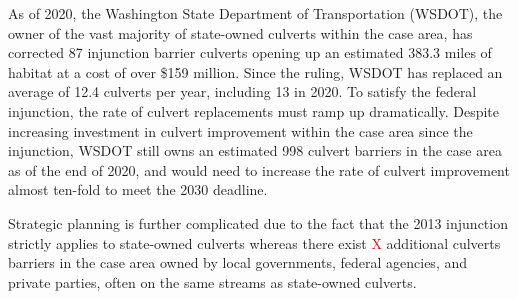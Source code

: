 \documentclass[12pt]{elsarticle}
\begin{document}
As of 2020, the Washington State Department of Transportation (WSDOT), the owner of the vast majority of state-owned culverts within the case area, has corrected 87 injunction barrier culverts opening up an estimated 383.3 miles of habitat at a cost of over \$159 million. Since the ruling, WSDOT has replaced an average of 12.4 culverts per year, including 13 in 2020. To satisfy the federal injunction, the rate of culvert replacements must ramp up dramatically. Despite increasing investment in culvert improvement within the case area since the injunction, WSDOT still owns an estimated 998 culvert barriers in the case area as of the end of 2020, and would need to increase the rate of culvert improvement almost ten-fold to meet the 2030 deadline.  


Strategic planning is further complicated due to the fact that the 2013 injunction strictly applies to state-owned culverts whereas there exist \textcolor{red}{X} additional culverts barriers in the case area owned by local governments, federal agencies, and private parties, often on the same streams as state-owned culverts.

\end{document}
